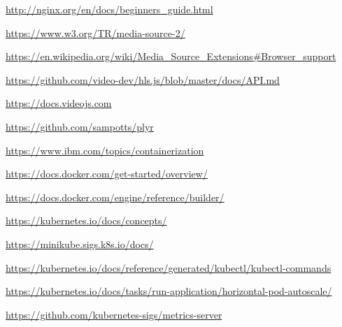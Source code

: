 \documentclass{article}
\begin{document}
\begin{thebibliography}{}
\item \url{http://nginx.org/en/docs/beginners_guide.html}

\item \url{https://www.w3.org/TR/media-source-2/}

\item \url{https://en.wikipedia.org/wiki/Media_Source_Extensions#Browser_support}

\item \url{https://github.com/video-dev/hls.js/blob/master/docs/API.md}

\item \url{https://docs.videojs.com}

\item \url{https://github.com/sampotts/plyr}

\item \url{https://www.ibm.com/topics/containerization}

\item \url{https://docs.docker.com/get-started/overview/}

\item \url{https://docs.docker.com/engine/reference/builder/}

\item \url{https://kubernetes.io/docs/concepts/}

\item \url{https://minikube.sigs.k8s.io/docs/}

\item \url{https://kubernetes.io/docs/reference/generated/kubectl/kubectl-commands}

\item \url{https://kubernetes.io/docs/tasks/run-application/horizontal-pod-autoscale/}

\item \url{https://github.com/kubernetes-sigs/metrics-server}

\end{thebibliography}
\end{document}
